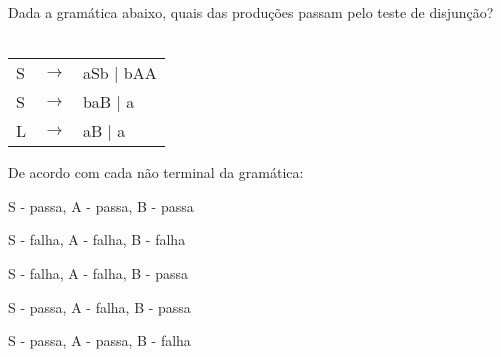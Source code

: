 \question[10]
Dada a gramática abaixo, quais das produções passam pelo teste de disjunção?\\
\\
\begin{tabular}{|l c l}
	S & $\rightarrow$ & aSb | bAA \\
    S & $\rightarrow$ & b{aB} | a \\
	L & $\rightarrow$ & aB | a \\
\end{tabular}

De acordo com cada não terminal da gramática:
\begin{choices}
\item S - passa, A - passa, B - passa
\item S - falha, A - falha, B - falha
\item S - falha, A - falha, B - passa
\item S - passa, A - falha, B - passa
\item S - passa, A - passa, B - falha %
\end{choices}
\answerline

